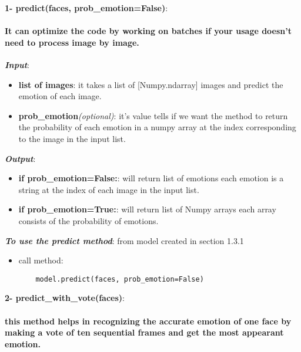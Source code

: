 \newpage



\noindent\textbf{1- predict(faces, prob\_emotion=False)}:
\paragraph{It can optimize the code by working on batches if your usage doesn't need to process image by image.\newline}
\bigbreak
\noindent\textbf{\textit{Input}}:
\begin{itemize}
	\item \textbf{list of images}:\newline
	it takes a list of [Numpy.ndarray] images and predict the emotion of each image.
	\item \textbf{prob\_emotion}\textit{(optional)}:\newline
	it's value tells if we want the method to return the probability of each emotion in a numpy array at the index corresponding to the image in the input list. 
\end{itemize}
\noindent\textbf{\textit{Output}}:
\begin{itemize}
	\item \textbf{if prob\_emotion=False:}:\newline
	will return list of emotions each emotion is a string at the index of each image in the input list.
	\item \textbf{if prob\_emotion=True:}:\newline
	will return list of Numpy arrays each array consists of the probability of emotions.
\end{itemize}


\textbf{\textit{To use the predict method}}:
\bigbreak
from model created in section 1.3.1

\begin{itemize}
	\item call method:
	\begin{verbatim}
	model.predict(faces, prob_emotion=False)
	\end{verbatim}
\end{itemize}

\newpage

\noindent\textbf{2- predict\_with\_vote(faces)}:
\paragraph{this method helps in recognizing the accurate emotion of one face by making a vote of ten sequential frames and get the most appearant emotion. \newline}

